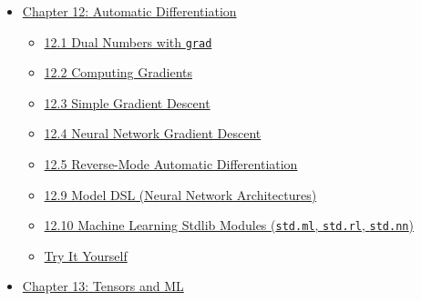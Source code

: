 \documentclass[
  english,
]{book}
\providecommand{\tightlist}{%
  \setlength{\itemsep}{0pt}\setlength{\parskip}{0pt}}
\begin{document}
\begin{itemize}
  \begin{itemize}
  \tightlist
  \item
    \hyperref[111-channels]{11.1 Channels}
  \item
    \hyperref[112-spawning-tasks-with-spawn]{11.2 Spawning Tasks with
    \texttt{spawn}}
  \item
    \hyperref[113-parallel-for-loops]{11.3 Parallel For Loops}
  \item
    \hyperref[114-atomics-thread-safe-counters]{11.4 Atomics:
    Thread-Safe Counters}
  \item
    \hyperref[115-producer-consumer-pattern]{11.5 Producer-Consumer
    Pattern}
  \item
    \hyperref[116-time-functions]{11.6 Time Functions}
  \item
    \hyperref[117-asyncawait]{11.7 Async/Await}
  \item
    \hyperref[115-reverse-mode-automatic-differentiation]{11.5
    Reverse-Mode Automatic Differentiation}
  \item
    \hyperref[try-it-yourself]{Try It Yourself}
  \end{itemize}
\item
  \hyperref[chapter-12-automatic-differentiation]{Chapter 12: Automatic
  Differentiation}

  \begin{itemize}
  \tightlist
  \item
    \hyperref[121-dual-numbers-with-grad]{12.1 Dual Numbers with
    \texttt{grad}}
  \item
    \hyperref[122-computing-gradients]{12.2 Computing Gradients}
  \item
    \hyperref[123-simple-gradient-descent]{12.3 Simple Gradient Descent}
  \item
    \hyperref[124-neural-network-gradient-descent]{12.4 Neural Network
    Gradient Descent}
  \item
    \hyperref[125-reverse-mode-automatic-differentiation]{12.5
    Reverse-Mode Automatic Differentiation}
  \item
    \hyperref[129-model-dsl-neural-network-architectures]{12.9 Model DSL
    (Neural Network Architectures)}
  \item
    \hyperref[1210-machine-learning-stdlib-modules-stdml-stdrl-stdnn]{12.10
    Machine Learning Stdlib Modules (\texttt{std.ml}, \texttt{std.rl},
    \texttt{std.nn})}
  \item
    \hyperref[try-it-yourself]{Try It Yourself}
  \end{itemize}
\item
  \hyperref[chapter-13-tensors-and-ml]{Chapter 13: Tensors and ML}


\end{itemize}
\end{document}
